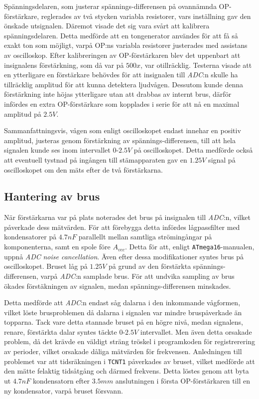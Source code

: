 \documentclass[a4paper]{article}
\begin{document}
Spänningsdelaren, som justerar spännings-differensen på ovannämnda OP-förstärkare, reglerades av två stycken variabla resistorer, vars inställning gav den önskade utsignalen. Däremot visade det sig vara svårt att kalibrera spänningsdelaren. Detta medförde att en tongenerator användes för att få så exakt ton som möjligt, varpå OP:ns variabla resistorer justerades med assistans av oscilloskop. Efter kalibreringen av OP-förstärkaren blev det uppenbart att insignalens förstärkning, som då var på $500x$, var otillräcklig. Testerna visade att en ytterligare en förstärkare behövdes för att insignalen till \textit{ADC}:n skulle ha tillräcklig amplitud för att kunna detektera ljudvågen. Dessutom kunde denna förstärkning inte höjas ytterligare utan att drabbas av internt brus, därför infördes en extra OP-förstärkare som kopplades i serie för att nå en maximal amplitud på $2.5V$.\cite{op}

Sammanfattningsvis, vågen som enligt oscilloskopet endast innehar en positiv amplitud, justeras genom förstärkning av spännings-differensen, till att hela signalen kunde ses inom intervallet $0$-$2.5V$ på oscilloskopet. Detta medförde också att eventuell tystnad på ingången till stämapparaten gav en $1.25V$ signal på oscilloskopet om den mäts efter de två förstärkarna.


\subsection{Hantering av brus}
\label{sec:brus}
När förstärkarna var på plats noterades det brus på insignalen till \textit{ADC}:n, vilket påverkade dess mätvärden. För att förebygga detta infördes lågpassfilter med kondensatorer på $4.7nF$ parallellt mellan samtliga strömingångar på komponenterna, samt en spole före $A_{vcc}$. Detta för att, enligt \texttt{ATmega16}-manualen, uppnå \textit{ADC} \textit{noise cancellation}.\cite[p.~210]{atmega16} Även efter dessa modifikationer syntes brus på oscilloskopet. Bruset låg på $1.25V$ på grund av den förstärkta spännings-differensen, varpå \textit{ADC}:n samplade brus. För att undvika sampling av brus ökades förstäkningen av signalen, medan spännings-differensen minskades.\cite{hw}

Detta medförde att \textit{ADC}:n endast såg dalarna i den inkommande vågformen, vilket löste brusproblemen då dalarna i signalen var mindre bruspåverkade än topparna. Tack vare detta stannade bruset på en högre nivå, medan signalens, renare, förstärkta dalar syntes täckte $0$-$2.5V$ intervallet. Men även detta orsakade problem, då det krävde en väldigt sträng tröskel i programkoden för registrerering av perioder, vilket orsakade dåliga mätvärden för frekvensen. Anledningen till problemet var att tidsräkningen i \texttt{TCNT1} påverkades av bruset, vilket medförde att den mätte felaktig tidsåtgång och därmed frekvens. Detta löstes genom att byta ut $4.7nF$ kondensatorn efter $3.5mm$ anslutningen i första OP-förstärkaren till en ny kondensator, varpå bruset försvann.
\end{document}
